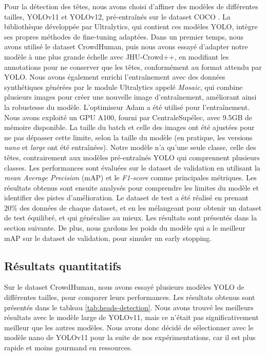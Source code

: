 Pour la détection des têtes, nous avons choisi d'affiner des modèles de différentes tailles, YOLOv11 et YOLOv12, pré-entraînés sur le dataset COCO \cite{lin2015microsoftcococommonobjects}. La bibliothèque développée par Ultralytics, qui contient ces modèles YOLO, intègre ses propres méthodes de fine-tuning adaptées.
Dans un premier temps, nous avons utilisé le dataset CrowdHuman, puis nous avons essayé d'adapter notre modèle à une plus grande échelle avec JHU-Crowd++, en modifiant les annotations pour ne conserver que les têtes, conformément au format attendu par YOLO. Nous avons également enrichi l'entraînement avec des données synthétiques générées par le module Ultralytics appelé \textit{Mosaic}, qui combine plusieurs images pour créer une nouvelle image d'entraînement, améliorant ainsi la robustesse du modèle.
L'optimiseur Adam a été utilisé pour l'entraînement. Nous avons exploité un GPU A100, fourni par CentraleSupélec, avec 9.5GB de mémoire disponible. La taille du batch et celle des images ont été ajustées pour ne pas dépasser cette limite, selon la taille du modèle (en pratique, les versions \textit{nano} et \textit{large} ont été entraînées).
Notre modèle n'a qu'une seule classe, celle des têtes, contrairement aux modèles pré-entraînés YOLO qui comprennent plusieurs classes. Les performances sont évaluées sur le dataset de validation en utilisant la \textit{mean Average Precision} (mAP) et le \textit{F1-score} comme principales métriques. Les résultats obtenus sont ensuite analysés pour comprendre les limites du modèle et identifier des pistes d'amélioration.
Le dataset de test a été réalisé en prenant 20\% des données de chaque dataset, et en les mélangeant pour obtenir un dataset de test équilibré, et qui généralise au mieux. Les résultats sont présentés dans la section suivante. De plus, nous gardons les poids du modèle qui a le meilleur mAP sur le dataset de validation, pour simuler un early stopping.

\subsection{Résultats quantitatifs}

Sur le dataset CrowdHuman, nous avons essayé plusieurs modèles YOLO de différentes tailles, pour comparer leurs performances. Les résultats obtenus sont présentés dans le tableau \ref{tab:heads-detection}. Nous avons trouvé les meilleurs résultats avec le modèle large de YOLOv11, mais ce n'était pas significativement meilleur que les autres modèles. Nous avons donc décidé de sélectionner avec le modèle nano de YOLOv11 pour la suite de nos expérimentations, car il est plus rapide et moins gourmand en ressources.

